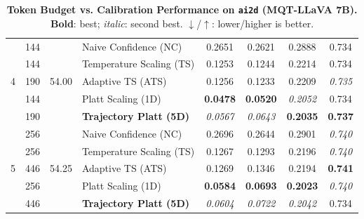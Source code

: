 \begin{table}[t]
\begin{tabular}{ccclcccc}
\midrule
\multirow{5}{*}{4} & 144 & \multirow{5}{*}{54.00} & Naive Confidence (NC) & 0.2651 & 0.2621 & 0.2888 & 0.734 \\
 & 144 &  & Temperature Scaling (TS) & 0.1253 & 0.1244 & 0.2214 & 0.734 \\
 & 190 &  & Adaptive TS (ATS) & 0.1256 & 0.1233 & 0.2209 & \textit{0.735} \\
 & 144 &  & Platt Scaling (1D) & \textbf{0.0478} & \textbf{0.0520} & \textit{0.2052} & 0.734 \\
 & 190 &  & \textbf{Trajectory Platt (5D)} & \textit{0.0567} & \textit{0.0643} & \textbf{0.2035} & \textbf{0.737} \\
\midrule
\multirow{5}{*}{5} & 256 & \multirow{5}{*}{54.25} & Naive Confidence (NC) & 0.2696 & 0.2644 & 0.2901 & \textit{0.740} \\
 & 256 &  & Temperature Scaling (TS) & 0.1267 & 0.1293 & 0.2196 & \textit{0.740} \\
 & 446 &  & Adaptive TS (ATS) & 0.1269 & 0.1346 & 0.2194 & \textbf{0.741} \\
 & 256 &  & Platt Scaling (1D) & \textbf{0.0584} & \textbf{0.0693} & \textbf{0.2023} & \textit{0.740} \\
 & 446 &  & \textbf{Trajectory Platt (5D)} & \textit{0.0604} & \textit{0.0722} & \textit{0.2042} & 0.734 \\
\bottomrule
\end{tabular}
\caption{\textbf{Token Budget vs. Calibration Performance on \texttt{ai2d} (MQT-LLaVA 7B).} \textbf{Bold}: best; \textit{italic}: second best. $\downarrow$/$\uparrow$: lower/higher is better.}
\label{tab:token_budget_ai2d_mqt}
\end{table}
